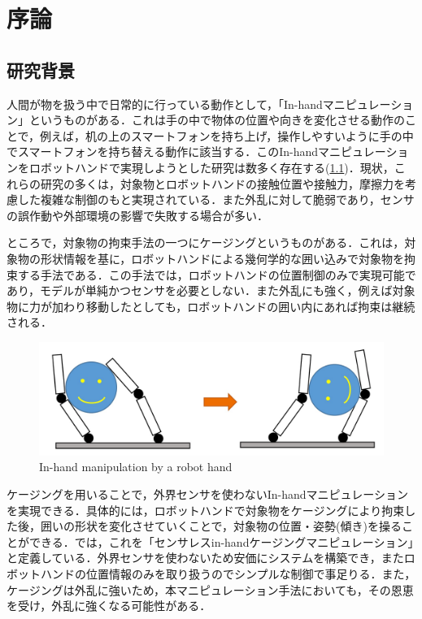 \documentclass[a4paper,twoside,12pt,papersize, dvipdfmx]{iirthesis}
\begin{document}
    \newcommand{\figref}[1]{\figurename\ref{#1}}
    \newcommand{\tabref}[1]{\tablename\ref{#1}}
    \renewcommand{\eqref}[1]{式~(\ref{#1})}
    \newcommand{\chapref}[1]{\ref{#1}章}
    \newcommand{\secref}[1]{\ref{#1}節}
    \newcommand{\ssecref}[1]{\ref{#1}項}
    \newcommand{\appref}[1]{付録\ref{#1}}
\fi


\chapter{序論}\label{chap::intro}
\minitoc

\section{研究背景}\label{sec::intro::background}
人間が物を扱う中で日常的に行っている動作として，「In-handマニピュレーション」というものがある．これは手の中で物体の位置や向きを変化させる動作のことで，例えば，机の上のスマートフォンを持ち上げ，操作しやすいように手の中でスマートフォンを持ち替える動作に該当する．このIn-handマニピュレーションをロボットハンドで実現しようとした研究は数多く存在する(\figref{fig::intro::ihm})．現状，これらの研究の多くは，対象物とロボットハンドの接触位置や接触力，摩擦力を考慮した複雑な制御のもと実現されている．また外乱に対して脆弱であり，センサの誤作動や外部環境の影響で失敗する場合が多い．\par

ところで，対象物の拘束手法の一つにケージング\cite{rimon1999}というものがある．これは，対象物の形状情報を基に，ロボットハンドによる幾何学的な囲い込みで対象物を拘束する手法である．この手法では，ロボットハンドの位置制御のみで実現可能であり，モデルが単純かつセンサを必要としない．また外乱にも強く，例えば対象物に力が加わり移動したとしても，ロボットハンドの囲い内にあれば拘束は継続される．　\par

\begin{figure}[b]
\centering
\includegraphics[width=0.7\hsize]{fig/1-introduction/in-hand.jpg}
\caption{In-hand manipulation by a robot hand \cite{komiyama2021}}
\label{fig::intro::ihm}
\end{figure}

ケージングを用いることで，外界センサを使わないIn-handマニピュレーションを実現できる．具体的には，ロボットハンドで対象物をケージングにより拘束した後，囲いの形状を変化させていくことで，対象物の位置・姿勢(傾き)を操ることができる．\cite{komiyama2021}では，これを「センサレスin-handケージングマニピュレーション」と定義している．外界センサを使わないため安価にシステムを構築でき，またロボットハンドの位置情報のみを取り扱うのでシンプルな制御で事足りる．また，ケージングは外乱に強いため，本マニピュレーション手法においても，その恩恵を受け，外乱に強くなる可能性がある．
\end{document}
